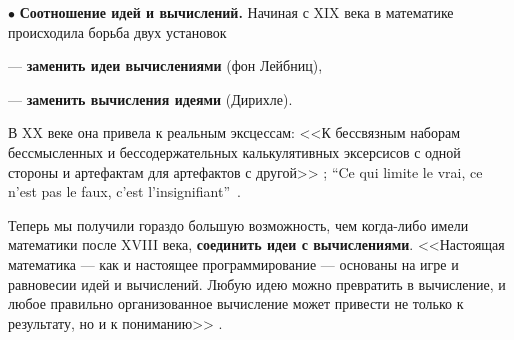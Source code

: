 \documentclass[intlimits,twoside,a4paper,11pt]{article}
\begin{document}
		\par\smallskip
		$\bullet$  {\bf Соотношение идей и вычислений.} Начиная с XIX века в математике 
		происходила борьба двух установок
		\par\smallskip
		--- {\bf заменить идеи вычислениями} (фон Лейбниц),
		\par\smallskip
		--- {\bf заменить вычисления идеями} (Дирихле).
		\par\smallskip\noindent
		В XX веке она привела к реальным эксцессам: <<К бессвязным наборам 
		бессмысленных и бессодержательных калькулятивных эксерсисов с одной
		стороны и артефактам для артефактов с другой>> \cite{VHY};
		``Ce qui limite le vrai, ce n'est pas le faux, c'est l'insignifiant''~\cite{Ch}.
		\par
		Теперь мы получили гораздо большую возможность, чем когда-либо имели
		математики после XVIII века, {\bf соединить идеи с вычислениями}.
		<<Настоящая математика — как и настоящее программирование — основаны на игре 
		и равновесии идей и вычислений. Любую идею можно превратить в вычисление, и 
		любое правильно организованное вычисление может привести не только к результату, 
		но и к пониманию>> \cite{VHY}.
		
\end{document}

